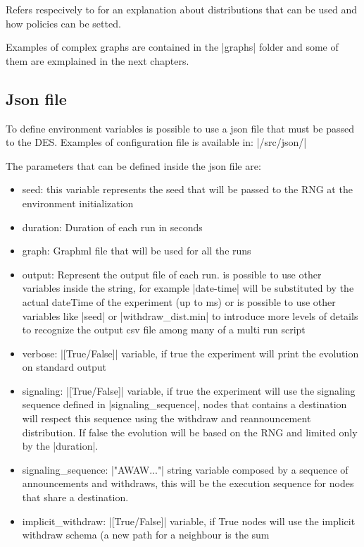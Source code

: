 \documentclass[10pt,journal,onecolumn]{IEEEtran}
\begin{document}
Refers respecively to  for an explanation
about distributions that can be used and how policies can be setted.

Examples of complex graphs are contained in the |graphs| folder and some of them
are exmplained in the next chapters.

\subsection{Json file}
\label{subsec:json_file}

To define environment variables is possible to use a json file that must be 
passed to the DES. 
Examples of configuration file is available in: |/src/json/|

The parameters that can be defined inside the json file are:
\begin{itemize}
    \item seed: this variable represents the seed that will be passed to 
		the \ac{RNG} at the environment initialization
    \item duration: Duration of each run in seconds
    \item graph: Graphml file that will be used for all the runs
    \item output: Represent the output file of each run. is possible to use 
		other variables inside the string, for example |{date-time}| will be 
		substituted by the actual dateTime of the experiment (up to ms) or 
		is possible to use other variables like |{seed}| or |{withdraw_dist.min}|
		to introduce more levels of details to recognize the output csv 
		file among many of a multi run script
    \item verbose: |[True/False]| variable, if true the experiment will 
		print the evolution on standard output
	\item signaling: |[True/False]| variable, if true the experiment will use 
		the signaling sequence defined in |signaling_sequence|, nodes that contains
		a destination will respect this sequence using the withdraw and reannouncement
		distribution.
		If false the evolution will be based on the \ac{RNG} and limited only
		by the |duration|.
	\item signaling\_sequence: |"AWAW..."| string variable composed by a 
		sequence of announcements and withdraws, this will be the execution sequence
		for nodes that share a destination.
	\item implicit\_withdraw: |[True/False]| variable, if True nodes will 
		use the implicit withdraw schema (a new path for a neighbour is the sum

\end{itemize}
\end{document}

